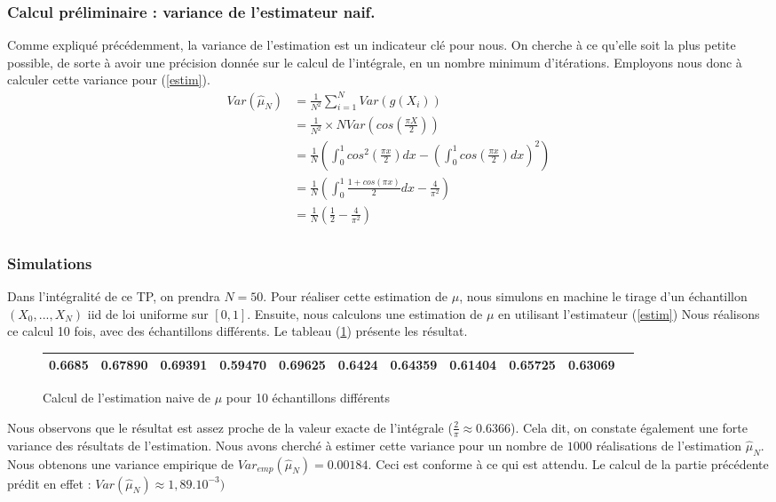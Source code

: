 \documentclass{article}
\begin{document}
\subsubsection{Calcul préliminaire : variance de l'estimateur naif.}
Comme expliqué précédemment, la variance de l'estimation 
est un indicateur clé pour nous. On cherche à ce qu'elle soit la plus petite possible, 
de sorte à avoir une précision donnée sur le calcul de l'intégrale, en un nombre
minimum d'itérations. Employons nous donc à calculer cette variance pour (\ref{estim}). 
\begin{align*} 
   Var(\hat{\mu}_N) &= \frac1{N^2} \sum_{i=1}^N Var(g(X_i))\\ 
   &= \frac1{N^2}\times N Var(cos(\frac{\pi X}2)) \\ 
   &= \frac1{N} \left ( \int_0^1 cos^2(\frac{\pi x}2)dx - \left ( \int_0^1 cos(\frac{\pi x}2)dx \right )^2 \right )\\
   &= \frac1{N} \left ( \int_0^1 \frac{1+cos(\pi x)}{2}dx - 
    \frac4{\pi^2} \right )\\
   &= \frac1{N} \left ( \frac{1}{2} - 
    \frac4{\pi^2} \right )\\
 \end{align*}
\subsubsection{Simulations}
Dans l'intégralité de ce TP, on prendra $N=50$.
Pour réaliser cette estimation de $\mu$, nous simulons en machine
le tirage d'un échantillon $(X_{0},\textrm{...},X_{N})$ iid de loi uniforme sur $[0,1]$.
Ensuite, nous calculons une estimation de $\mu$ en utilisant l'estimateur (\ref{estim})
Nous réalisons ce calcul 10 fois, avec des échantillons différents. Le tableau (\ref{naif}) 
présente les résultat.
\begin{figure}[h!]
  \centering
  \caption{Calcul de l'estimation naive de $\mu$ pour 10 échantillons différents}
  \label{naif}
  \begin{tabular}{|*{11}{c|}}
    \hline 0.6685 & 0.67890& 0.69391& 0.59470& 0.69625&0.6424 & 0.64359& 0.61404& 0.65725& 0.63069 \\
    \hline
  \end{tabular}
\end{figure}

Nous observons que le résultat est assez proche de la valeur exacte de l'intégrale 
($\frac{2}{\pi} \approx 0.6366$). Cela dit, on constate également une forte variance des résultats de l'estimation. Nous avons cherché à 
estimer cette variance pour un nombre de $1000$ réalisations de l'estimation $\hat{\mu}_{N}$. Nous obtenons une variance empirique de $Var_{emp}(\hat{\mu}_{N})=0.00184$.
Ceci est conforme à ce qui est attendu. Le calcul de la partie précédente prédit en effet :  $Var(\hat{\mu}_{N}) \approx 1,89.10^{-3})$
\end{document}

